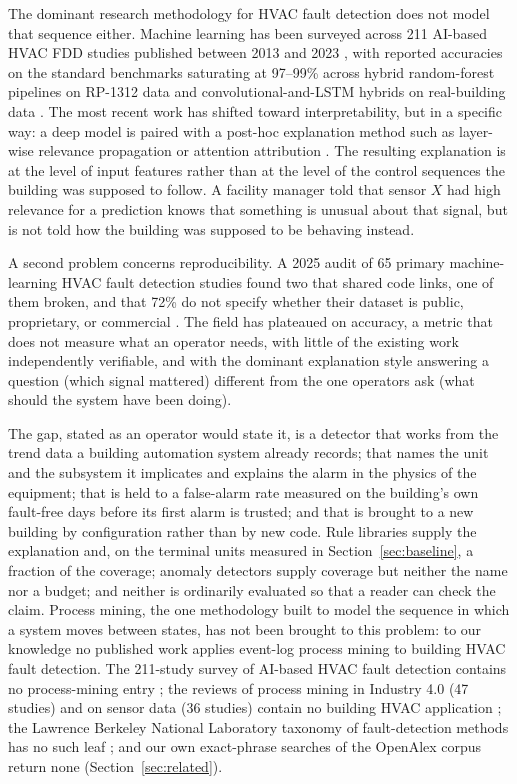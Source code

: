 \documentclass[11pt,letterpaper]{article}
\begin{document}
The dominant research methodology for HVAC fault detection does not model that sequence either. Machine learning has been surveyed across 211 AI-based HVAC FDD studies published between 2013 and 2023 \cite{bi2024aihvacreview}, with reported accuracies on the standard benchmarks saturating at 97--99\% across hybrid random-forest pipelines on RP-1312 data \cite{tun2021hybridrfsvm} and convolutional-and-LSTM hybrids on real-building data \cite{prince2025improved1dcnnlstm}. The most recent work has shifted toward interpretability, but in a specific way: a deep model is paired with a post-hoc explanation method such as layer-wise relevance propagation or attention attribution \cite{deng2024afgcn,wang2025xmhac,li2023cnnlrp,xiong2024imlrp,chen2023interpretablereview}. The resulting explanation is at the level of input features rather than at the level of the control sequences the building was supposed to follow. A facility manager told that sensor $X$ had high relevance for a prediction knows that something is unusual about that signal, but is not told how the building was supposed to be behaving instead.

A second problem concerns reproducibility. A 2025 audit of 65 primary machine-learning HVAC fault detection studies found two that shared code links, one of them broken, and that 72\% do not specify whether their dataset is public, proprietary, or commercial \cite{mukhtar2025reproducibility}. The field has plateaued on accuracy, a metric that does not measure what an operator needs, with little of the existing work independently verifiable, and with the dominant explanation style answering a question (which signal mattered) different from the one operators ask (what should the system have been doing).

The gap, stated as an operator would state it, is a detector that works from the trend data a building automation system already records; that names the unit and the subsystem it implicates and explains the alarm in the physics of the equipment; that is held to a false-alarm rate measured on the building's own fault-free days before its first alarm is trusted; and that is brought to a new building by configuration rather than by new code. Rule libraries supply the explanation and, on the terminal units measured in Section~\ref{sec:baseline}, a fraction of the coverage; anomaly detectors supply coverage but neither the name nor a budget; and neither is ordinarily evaluated so that a reader can check the claim. Process mining, the one methodology built to model the sequence in which a system moves between states, has not been brought to this problem: to our knowledge no published work applies event-log process mining to building HVAC fault detection. The 211-study survey of AI-based HVAC fault detection contains no process-mining entry \cite{bi2024aihvacreview}; the reviews of process mining in Industry 4.0 (47 studies) and on sensor data (36 studies) contain no building HVAC application \cite{akhramovich2024pmindustry40,brzychczy2025pmsensorreview}; the Lawrence Berkeley National Laboratory taxonomy of fault-detection methods has no such leaf \cite{granderson2017fddtoolsurvey}; and our own exact-phrase searches of the OpenAlex corpus return none (Section~\ref{sec:related}).
\end{document}

